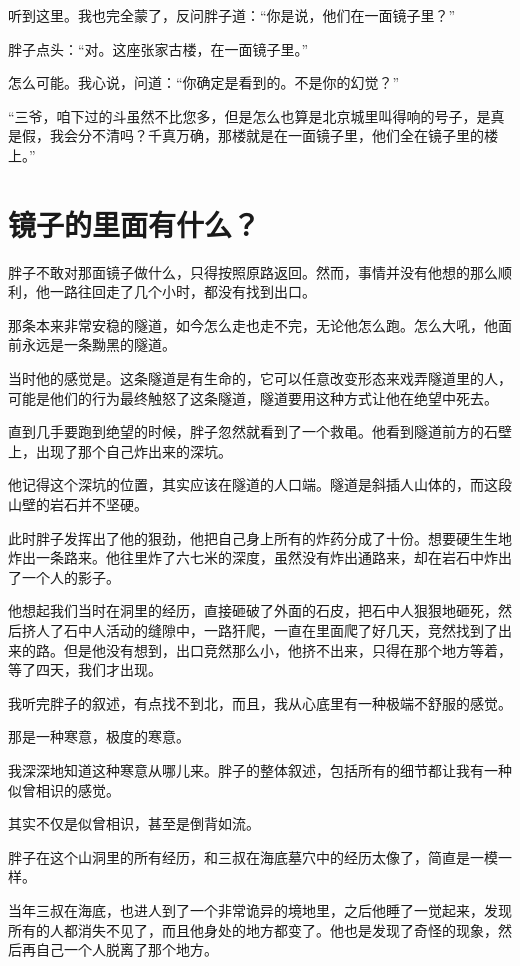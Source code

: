 听到这里。我也完全蒙了，反问胖子道：“你是说，他们在一面镜子里？”

胖子点头：“对。这座张家古楼，在一面镜子里。”

怎么可能。我心说，问道：“你确定是看到的。不是你的幻觉？”

“三爷，咱下过的斗虽然不比您多，但是怎么也算是北京城里叫得响的号子，是真是假，我会分不清吗？千真万确，那楼就是在一面镜子里，他们全在镜子里的楼上。”

\chapter{镜子的里面有什么？}

胖子不敢对那面镜子做什么，只得按照原路返回。然而，事情并没有他想的那么顺利，他一路往回走了几个小时，都没有找到出口。

那条本来非常安稳的隧道，如今怎么走也走不完，无论他怎么跑。怎么大吼，他面前永远是一条黝黑的隧道。

当时他的感觉是。这条隧道是有生命的，它可以任意改变形态来戏弄隧道里的人，可能是他们的行为最终触怒了这条隧道，隧道要用这种方式让他在绝望中死去。

直到几手要跑到绝望的时候，胖子忽然就看到了一个救黾。他看到隧道前方的石壁上，出现了那个自己炸出来的深坑。

他记得这个深坑的位置，其实应该在隧道的人口端。隧道是斜插人山体的，而这段山壁的岩石并不坚硬。

此时胖子发挥出了他的狠劲，他把自己身上所有的炸药分成了十份。想要硬生生地炸出一条路来。他往里炸了六七米的深度，虽然没有炸出通路来，却在岩石中炸出了一个人的影子。

他想起我们当时在洞里的经历，直接砸破了外面的石皮，把石中人狠狠地砸死，然后挤人了石中人活动的缝隙中，一路犴爬，一直在里面爬了好几天，竞然找到了出来的路。但是他没有想到，出口竞然那么小，他挤不出来，只得在那个地方等着，等了四天，我们才出现。

我听完胖子的叙述，有点找不到北，而且，我从心底里有一种极端不舒服的感觉。

那是一种寒意，极度的寒意。

我深深地知道这种寒意从哪儿来。胖子的整体叙述，包括所有的细节都让我有一种似曾相识的感觉。

其实不仅是似曾相识，甚至是倒背如流。

胖子在这个山洞里的所有经历，和三叔在海底墓穴中的经历太像了，简直是一模一样。

当年三叔在海底，也进人到了一个非常诡异的境地里，之后他睡了一觉起来，发现所有的人都消失不见了，而且他身处的地方都变了。他也是发现了奇怪的现象，然后再自己一个人脱离了那个地方。

